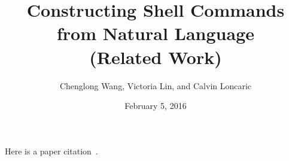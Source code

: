 \documentclass[10pt]{article}
\title{Constructing Shell Commands from Natural Language \\(Related Work)}
\author{Chenglong Wang, Victoria Lin, and Calvin Loncaric}
\date{February 5, 2016}
\begin{document}
\maketitle



Here is a paper citation~\cite{DBLP:journals/corr/DesaiGHJKMRR15}.



\end{document}
